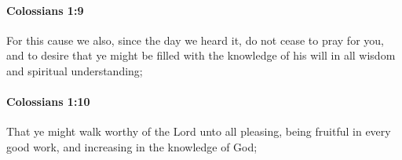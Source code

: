 		\paragraph{Colossians 1:9} %
			\label{COLOSSIANS-1-9}

			For this cause we also, since the day we heard it, do not cease to pray for you, and to desire that ye might be filled with the knowledge of his will in all wisdom and spiritual understanding;

			\begin{framed}
			\scriptsize
				\begin{compactdesc}
					\item[SBLG] 
				\end{compactdesc}
			\end{framed}

		\paragraph{Colossians 1:10} %
			\label{COLOSSIANS-1-10}

			That ye might walk worthy of the Lord unto all pleasing, being fruitful in every good work, and increasing in the knowledge of God;

